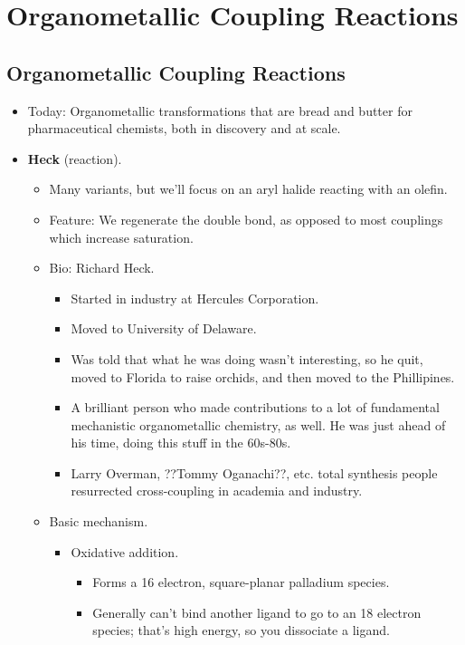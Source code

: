\documentclass[../notes.tex]{subfiles}
\begin{document}
\chapter{Organometallic Coupling Reactions}
\section{Organometallic Coupling Reactions}
\begin{itemize}
    \item {}Today: Organometallic transformations that are bread and butter for pharmaceutical chemists, both in discovery and at scale.
    \item \textbf{Heck} (reaction).
    \begin{itemize}
        \item Many variants, but we'll focus on an aryl halide reacting with an olefin.
        \item Feature: We regenerate the double bond, as opposed to most couplings which increase saturation.
        \item Bio: Richard Heck.
        \begin{itemize}
            \item Started in industry at Hercules Corporation.
            \item Moved to University of Delaware.
            \item Was told that what he was doing wasn't interesting, so he quit, moved to Florida to raise orchids, and then moved to the Phillipines.
            \item A brilliant person who made contributions to a lot of fundamental mechanistic organometallic chemistry, as well. He was just ahead of his time, doing this stuff in the 60s-80s.
            \item Larry Overman, ??Tommy Oganachi??, etc. total synthesis people resurrected cross-coupling in academia and industry.
        \end{itemize}
        \item Basic mechanism.
        \begin{itemize}
            \item Oxidative addition.
            \begin{itemize}
                \item Forms a 16 electron, square-planar palladium species.
                \item Generally can't bind another ligand to go to an 18 electron species; that's high energy, so you dissociate a ligand.

\end{itemize}
\end{itemize}
\end{itemize}
\end{itemize}
\end{document}
